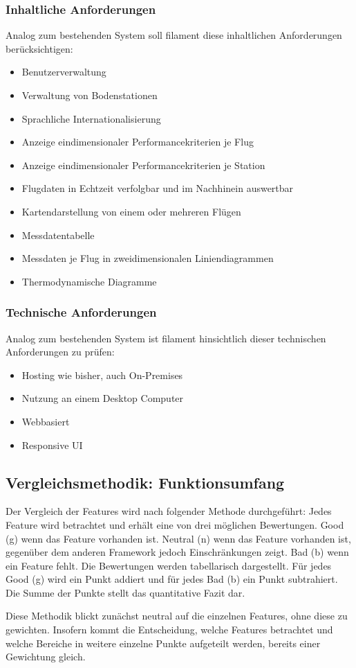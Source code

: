 \subsubsection{Inhaltliche Anforderungen}
Analog zum bestehenden System soll filament diese inhaltlichen Anforderungen berücksichtigen:
\begin{itemize}
    \item Benutzerverwaltung
    \item Verwaltung von Bodenstationen
    \item Sprachliche Internationalisierung
    \item Anzeige eindimensionaler Performancekriterien je Flug
    \item Anzeige eindimensionaler Performancekriterien je Station
    \item Flugdaten in Echtzeit verfolgbar und im Nachhinein auswertbar
    \item Kartendarstellung von einem oder mehreren Flügen
    \item Messdatentabelle
    \item Messdaten je Flug in zweidimensionalen Liniendiagrammen
    \item Thermodynamische Diagramme
\end{itemize}

\subsubsection{Technische Anforderungen}
Analog zum bestehenden System ist filament hinsichtlich dieser technischen Anforderungen zu prüfen:
\begin{itemize}
    \item Hosting wie bisher, auch On-Premises
    \item Nutzung an einem Desktop Computer
    \item Webbasiert
    \item Responsive UI
\end{itemize}

\subsection{Vergleichsmethodik: Funktionsumfang}
Der Vergleich der Features wird nach folgender Methode durchgeführt:
Jedes Feature wird betrachtet und erhält eine von drei möglichen Bewertungen.
Good (g) wenn das Feature vorhanden ist.
Neutral (n) wenn das Feature vorhanden ist, gegenüber dem anderen Framework jedoch Einschränkungen zeigt.
Bad (b) wenn ein Feature fehlt.
Die Bewertungen werden tabellarisch dargestellt.
Für jedes Good (g) wird ein Punkt addiert und für jedes Bad (b) ein Punkt subtrahiert.
Die Summe der Punkte stellt das quantitative Fazit dar.

Diese Methodik blickt zunächst neutral auf die einzelnen Features, ohne diese zu gewichten.
Insofern kommt die Entscheidung, welche Features betrachtet und welche Bereiche in weitere einzelne Punkte aufgeteilt werden, bereits einer Gewichtung gleich.
